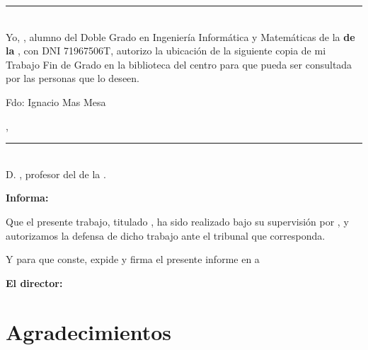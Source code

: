 \documentclass['../proyecto.tex']{memoir}
\begin{document}
\thispagestyle{empty}

\noindent\rule[-1ex]{\textwidth}{2pt}\\[4.5ex]

Yo, \textbf{\AuthorName}, alumno del Doble Grado en
Ingeniería Informática y Matemáticas de la \textbf{\FacultyOne de la
  \University}, con DNI 71967506T, autorizo la ubicación de
la siguiente copia de mi Trabajo Fin de Grado en la biblioteca del
centro para que pueda ser consultada por las personas que lo deseen.

\vspace{6cm}

\noindent Fdo: Ignacio Mas Mesa

\vspace{2cm}

\begin{flushright}
  \Location, \Time
\end{flushright}

\newpage

\thispagestyle{empty}

\noindent\rule[-1ex]{\textwidth}{2pt}\\[4.5ex]

D. \textbf{\MainProf}, profesor del
\Department de la \University.

\vspace{0.5cm}

\textbf{Informa:}

\vspace{0.5cm}

Que el presente trabajo, titulado \textit{\textbf{\ProjectTitle}}, ha
sido realizado bajo su supervisión por \textbf{\AuthorName}, y
autorizamos la defensa de dicho trabajo ante el tribunal que
corresponda.

\vspace{0.5cm}

Y para que conste, expide y firma el presente informe en \Location a \Time

\vspace{1cm}

\textbf{El director:}

\vspace{5cm}

\begin{minipage}{0.45\linewidth}
  \begin{center}
    \textbf{\MainProf}
  \end{center}
\end{minipage}

\chapter*{Agradecimientos}
\thispagestyle{empty}

\vspace{1cm}

\newpage
\end{document}
